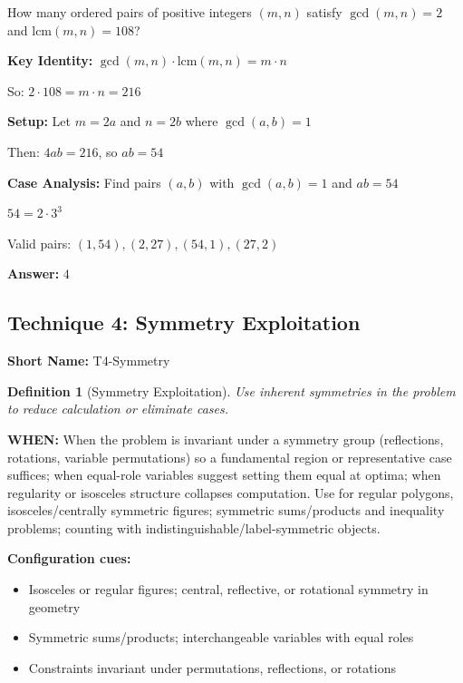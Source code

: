 \documentclass[12pt]{article}
\newtheorem{definition}{Definition}[section]
\newenvironment{problem}[1]
{\begin{tcolorbox}[colback=blue!5!white,colframe=blue!75!black,title={#1}]}{\end{tcolorbox}}
\newenvironment{solution}
{\begin{tcolorbox}[colback=green!5!white,colframe=green!75!black,title={Solution}]}{\end{tcolorbox}}
\begin{document}
\begin{problem}{AMC 12A 2020, Problem 15}
How many ordered pairs of positive integers $(m,n)$ satisfy $\gcd(m,n) = 2$ and $\text{lcm}(m,n) = 108$?
\end{problem}

\begin{solution}
\textbf{Key Identity:} $\gcd(m,n) \cdot \text{lcm}(m,n) = m \cdot n$

So: $2 \cdot 108 = m \cdot n = 216$

\textbf{Setup:} Let $m = 2a$ and $n = 2b$ where $\gcd(a,b) = 1$

Then: $4ab = 216$, so $ab = 54$

\textbf{Case Analysis:} Find pairs $(a,b)$ with $\gcd(a,b) = 1$ and $ab = 54$

$54 = 2 \cdot 3^3$

Valid pairs: $(1,54), (2,27), (54,1), (27,2)$

\textbf{Answer:} $4$
\end{solution}

\subsection{Technique 4: Symmetry Exploitation}
\textbf{Short Name:} T4-Symmetry

\begin{definition}[Symmetry Exploitation]
Use inherent symmetries in the problem to reduce calculation or eliminate cases.
\end{definition}

\textbf{WHEN:} When the problem is invariant under a symmetry group (reflections, rotations, variable permutations) so a fundamental region or representative case suffices; when equal-role variables suggest setting them equal at optima; when regularity or isosceles structure collapses computation. Use for regular polygons, isosceles/centrally symmetric figures; symmetric sums/products and inequality problems; counting with indistinguishable/label-symmetric objects.

\textbf{Configuration cues:}
\begin{itemize}
    \item Isosceles or regular figures; central, reflective, or rotational symmetry in geometry
    \item Symmetric sums/products; interchangeable variables with equal roles
    \item Constraints invariant under permutations, reflections, or rotations
\end{itemize}
\end{document}

